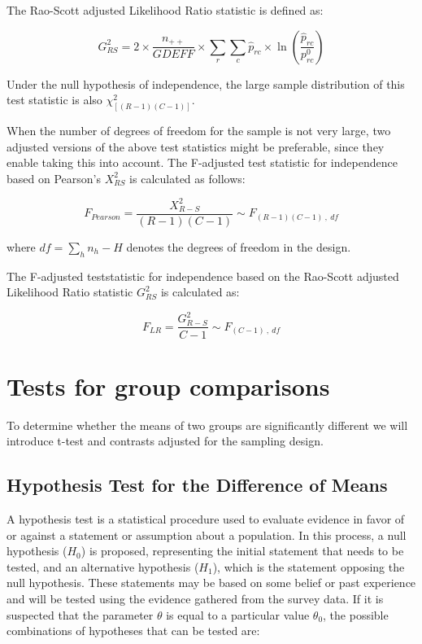 \documentclass[
  12pt,
]{book}
\begin{document}
The Rao-Scott adjusted Likelihood Ratio statistic is defined as:

\[
G_{RS}^{2} = 2 \times \frac {n_{++}} {GDEFF} \times \sum_{r} \sum_{c} \widehat p_{rc} \times \ln \left( \frac{\widehat p_{rc}}{p_{rc}^0} \right)
\]

Under the null hypothesis of independence, the large sample distribution of this test statistic is also \(\chi^2_{[(R-1) (C-1)]}\).

When the number of degrees of freedom for the sample is not very large, two adjusted versions of the above test statistics might be preferable, since they enable taking this into account. The F-adjusted test statistic for independence based on Pearson's \(X_{RS}^2\) is calculated as follows:

\[
F_{Pearson} = \frac{X^{2}_{R-S}}{(R-1)(C-1)} \sim F_{\left(R-1\right)\left(C-1\right) \ , \ df}
\]

where \(df = \sum_{h} n_h - H\) denotes the degrees of freedom in the design.

The F-adjusted teststatistic for independence based on the Rao-Scott adjusted Likelihood Ratio statistic \(G_{RS}^{2}\) is calculated as:

\[
F_{LR} = \frac{G^{2}_{R-S}}{C-1} \sim F_{\left(C-1\right) \ , \ df}
\]

\hypertarget{tests-for-group-comparisons}{%
\section{Tests for group comparisons}\label{tests-for-group-comparisons}}

To determine whether the means of two groups are significantly different we will introduce t-test and contrasts adjusted for the sampling design.

\hypertarget{hypothesis-test-for-the-difference-of-means}{%
\subsection{Hypothesis Test for the Difference of Means}\label{hypothesis-test-for-the-difference-of-means}}

A hypothesis test is a statistical procedure used to evaluate evidence in favor of or against a statement or assumption about a population. In this process, a null hypothesis (\(H_0\)) is proposed, representing the initial statement that needs to be tested, and an alternative hypothesis (\(H_1\)), which is the statement opposing the null hypothesis. These statements may be based on some belief or past experience and will be tested using the evidence gathered from the survey data. If it is suspected that the parameter \(\theta\) is equal to a particular value \(\theta_{0}\), the possible combinations of hypotheses that can be tested are:
\end{document}
